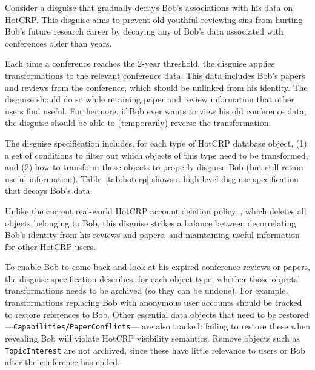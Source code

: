 Consider a disguise that gradually decays Bob's associations with his data on HotCRP. This disguise
aims to prevent old youthful reviewing sins from hurting Bob's future research career by 
decaying any of Bob's data associated with conferences older than  years.

Each time a conference reaches the 2-year threshold, the disguise applies transformations to the
relevant conference data. This data includes Bob's papers and reviews from the conference, which
should be unlinked from his identity. 
%
The disguise should do so while retaining paper and review information that other users find useful.
%
Furthermore, if Bob ever wants to view his old conference data, the disguise should be able to
(temporarily) reverse the transformation. 

The disguise specification includes, for each type of HotCRP database object, (1) a set of
conditions to filter out which objects of this type need to be transformed, and (2) how to transform
these objects to properly disguise Bob (but still retain useful information).
Table~\ref{tab:hotcrp} shows a high-level disguise specification that decays Bob's data.

Unlike the current real-world HotCRP account deletion policy~\cite{hotcrp:privacy}, which
deletes all objects belonging to Bob, this disguise strikes a balance between decorrelating
Bob's identity from his reviews and papers, and maintaining useful information for other
HotCRP users.

To enable Bob to come back and look at his expired conference reviews or papers, the disguise
specification describes, for each object type, whether those objects' transformations needs to be
archived (so they can be undone). For example, transformations replacing Bob with anonymous user
accounts should be tracked to restore references to Bob. Other essential data objects that need to
be restored---\texttt{Capabilities/PaperConflicts}--- are also tracked: failing to restore these
when revealing Bob will violate HotCRP visibility semantics. Remove objects such as  
\texttt{TopicInterest} are not archived, since these have little relevance to users or Bob
after the conference has ended.

